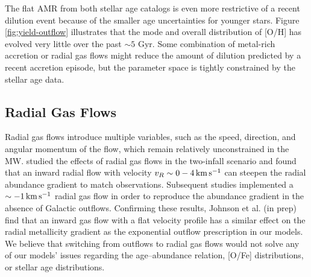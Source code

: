 \documentclass[twocolumn,twocolappendix,linenumbers]{aastex631}
\newcommand{\todo}[1]{{\color{red}#1}}
\newcommand{\kms}{\,{\rm km}\,{\rm s}^{-1}}
\begin{document}
The flat AMR from both stellar age catalogs is even more restrictive of a recent dilution event because of the smaller age uncertainties for younger stars. Figure \ref{fig:yield-outflow} illustrates that the mode and overall distribution of [O/H] has evolved very little over the past $\sim5$ Gyr. Some combination of metal-rich accretion or radial gas flows might reduce the amount of dilution predicted by a recent accretion episode, but the parameter space is tightly constrained by the stellar age data.

\subsection{Radial Gas Flows}
\label{sec:radial-flows}

Radial gas flows introduce multiple variables, such as the speed, direction, and angular momentum of the flow, which remain relatively unconstrained in the MW. \citet{spitoni_effects_2011} studied the effects of radial gas flows in the two-infall scenario and found that an inward radial flow with velocity $v_R\sim0-4\kms$ can steepen the radial abundance gradient to match observations. Subsequent studies \citep{palla_chemical_2020,palla_mapping_2024} implemented a $\sim-1\kms$ radial gas flow in order to reproduce the abundance gradient in the absence of Galactic outflows. Confirming these results, \todo{Johnson et al. (in prep)} find that an inward gas flow with a flat velocity profile has a similar effect on the radial metallicity gradient as the exponential outflow prescription in our models. We believe that switching from outflows to radial gas flows would not solve any of our models' issues regarding the age--abundance relation, [O/Fe] distributions, or stellar age distributions.

\end{document}
